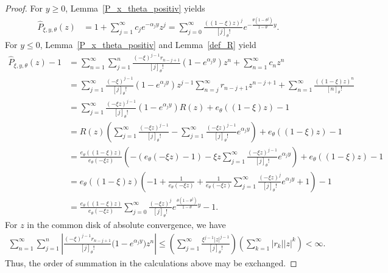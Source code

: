 \documentclass[10pt,a4paper]{amsart}
\newcommand{\1}{\mathds{1}}
\begin{document}
\begin{proof}
    For $y\ge 0$, Lemma~\ref{P_x_theta_positiv} yields
    \begin{align*}
        \hat{P}_{\xi,y,\theta}(z)
        &=1+\sum_{j=1}^\infty c_je^{-\alpha_jy}z^j
        =\sum_{j=0}^\infty \frac{((1-\xi)z)^j}{[j]_\theta!}e^{-\frac{\theta(1-\theta^j)}{1-\theta}y}.
    \end{align*}
    For $y\le 0$, Lemma~\ref{P_x_theta_positiv} and Lemma~\ref{def_R} yield
    \begin{align*}
        \hat{P}_{\xi,y,\theta}(z)-1
        &=\sum_{n=1}^\infty \sum_{j=1}^n \frac{(-\xi)^{j-1} r_{n-j+1}}{[j]_\theta!} \left(1 - e^{\alpha_j y} \right)z^n+\sum_{n=1}^\infty c_nz^n
         \\&=\sum_{j=1}^\infty \frac{(-\xi)^{j-1}}{[j]_\theta!} \left(1 - e^{\alpha_j y} \right)z^{j-1}\sum_{n=j}^\infty r_{n-j+1}z^{n-j+1}+\sum_{n=1}^\infty \frac{((1-\xi)z)^n}{[n]_\theta!}
        \\&=\sum_{j=1}^\infty \frac{(-\xi z)^{j-1} }{[j]_\theta!} \left(1 - e^{\alpha_j y} \right)R(z)+e_\theta((1-\xi)z)-1
        \\&=R(z)\left(\sum_{j=1}^\infty \frac{(-\xi z)^{j-1} }{[j]_\theta!}-\sum_{j=1}^\infty \frac{(-\xi z)^{j-1}}{[j]_\theta!}e^{\alpha_j y}\right)+e_\theta((1-\xi)z)-1
        \\&= \frac{e_\theta((1-\xi)z)}{e_\theta(-\xi z)}\left(-(e_\theta(-\xi z)-1)-\xi z\sum_{j=1}^\infty \frac{(-\xi z)^{j-1}}{[j]_\theta!}e^{\alpha_j y}\right)+e_\theta((1-\xi)z)-1
        \\&=e_\theta((1-\xi)z)\left(-1+\frac{1}{e_\theta(-\xi z)}+ \frac{1}{e_\theta(-\xi z)}\sum_{j=1}^\infty \frac{(-\xi z)^{j}}{[j]_\theta!}e^{\alpha_j y}+1\right)-1
        \\&=\frac{e_\theta((1-\xi)z)}{e_\theta(-\xi z)}\sum_{j=0}^\infty \frac{(-\xi z)^{j}}{[j]_\theta!}e^{\frac{\theta(1-\theta^j)}{1-\theta}y}-1.%
    \end{align*}
   For $z$ in the common disk of absolute convergence, we have
\begin{align*}
    \sum_{n=1}^\infty\sum_{j=1}^n
    \left|\frac{(-\xi)^{j-1}r_{n-j+1}}{[j]_\theta!} \bigl(1-e^{\alpha_jy}\bigr)z^n
    \right|
    \leq\left(\sum_{j=1}^\infty\frac{\xi^{j-1}|z|^{j-1}}{[j]_\theta!}\right)
    \left( \sum_{k=1}^\infty |r_k||z|^k\right)
    <\infty.
\end{align*}
Thus, the order of summation in the calculations above may be exchanged. 
\end{proof}
\end{document}
